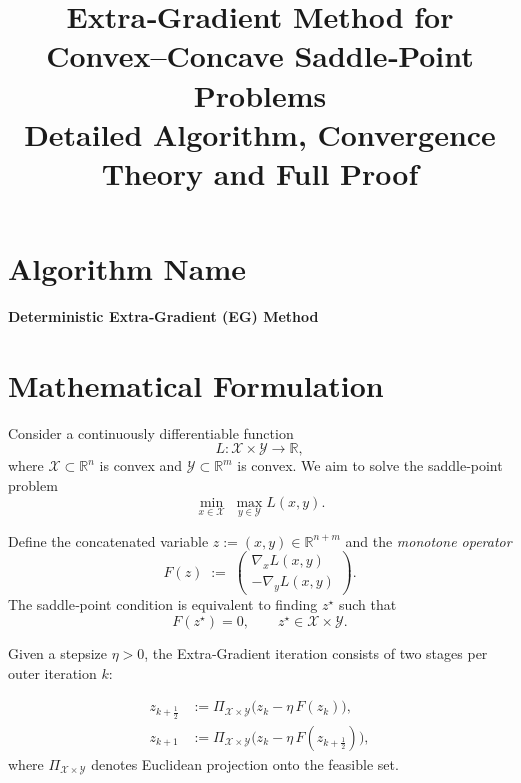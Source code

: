 \documentclass{article}
\begin{document}
\title{Extra‑Gradient Method for Convex–Concave Saddle‑Point Problems\\
Detailed Algorithm, Convergence Theory and Full Proof}
\author{}
\date{}
\maketitle

\tableofcontents
\newpage

\section*{Algorithm Name}
\begin{center}
\textbf{Deterministic Extra‑Gradient (EG) Method}
\end{center}

\section{Mathematical Formulation}
Consider a continuously differentiable function 
\[
L:\mathcal{X}\times\mathcal{Y}\rightarrow\mathbb{R},
\]
where $\mathcal{X}\subset\mathbb{R}^{n}$ is convex and $\mathcal{Y}\subset\mathbb{R}^{m}$ is convex.  
We aim to solve the saddle‑point problem
\[
\min_{x\in\mathcal{X}}\;\max_{y\in\mathcal{Y}} L(x,y).
\]

Define the concatenated variable $z:=(x,y)\in\mathbb{R}^{n+m}$ and the \emph{monotone operator}
\[
F(z)\;:=\;\begin{pmatrix}
\nabla_{x}L(x,y)\\[2mm]
-\nabla_{y}L(x,y)
\end{pmatrix}.
\]
The saddle‑point condition is equivalent to finding $z^{\star}$ such that
\[
F(z^{\star})=0,\qquad z^{\star}\in\mathcal{X}\times\mathcal{Y}.
\]

Given a stepsize $\eta>0$, the Extra‑Gradient iteration consists of two stages per outer iteration $k$:

\[
\begin{aligned}
z_{k+\frac12}&:=\Pi_{\mathcal{X}\times\mathcal{Y}}\!\bigl(z_{k}-\eta\,F(z_{k})\bigr), \tag{1}\\[2mm]
z_{k+1}&:=\Pi_{\mathcal{X}\times\mathcal{Y}}\!\bigl(z_{k}-\eta\,F(z_{k+\frac12})\bigr), \tag{2}
\end{aligned}
\]
where $\Pi_{\mathcal{X}\times\mathcal{Y}}$ denotes Euclidean projection onto the feasible set.
\end{document}
